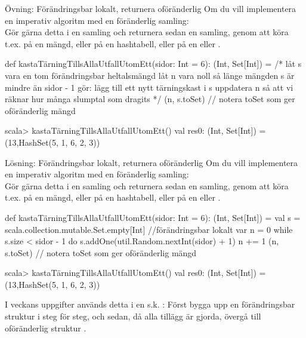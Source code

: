 \begin{Slide}{Övning: Förändringsbar lokalt, returnera oföränderlig}
\SlideFontSmall
Om du vill implementera en imperativ algoritm med en föränderlig samling:\\
Gör gärna detta  i en  samling och returnera sedan en  samling, genom att köra t.ex.  på en mängd, eller  på en hashtabell, eller  på en  eller .
\begin{Code}
def kastaTärningTillsAllaUtfallUtomEtt(sidor: Int = 6): (Int, Set[Int]) = 
  /* 
    låt s vara en tom förändringsbar heltalsmängd
    låt n vara noll
    så länge mängden s är mindre än sidor - 1 gör:
      lägg till ett nytt tärningskast i s
      uppdatera n så att vi räknar hur många slumptal som dragits
  */
  (n, s.toSet)   // notera toSet som ger oföränderlig mängd
\end{Code}
\begin{REPL}
scala> kastaTärningTillsAllaUtfallUtomEtt()
val res0: (Int, Set[Int]) = (13,HashSet(5, 1, 6, 2, 3))
\end{REPL}
\end{Slide}


\begin{Slide}{Lösning: Förändringsbar lokalt, returnera oföränderlig}
\SlideFontSmall
Om du vill implementera en imperativ algoritm med en föränderlig samling:\\
Gör gärna detta  i en  samling och returnera sedan en  samling, genom att köra t.ex.  på en mängd, eller  på en hashtabell, eller  på en  eller .
\begin{Code}
def kastaTärningTillsAllaUtfallUtomEtt(sidor: Int = 6): (Int, Set[Int]) = 
  val s = scala.collection.mutable.Set.empty[Int] //förändringsbar lokalt
  var n = 0
  while s.size < sidor - 1 do
    s.addOne(util.Random.nextInt(sidor) + 1)
    n += 1
  (n, s.toSet)   // notera toSet som ger oföränderlig mängd
\end{Code}
\begin{REPL}
scala> kastaTärningTillsAllaUtfallUtomEtt()
val res0: (Int, Set[Int]) = (13,HashSet(5, 1, 6, 2, 3))
\end{REPL}
I veckans uppgifter används detta i en s.k. : Först bygga upp en förändringsbar struktur i  steg för steg,  
och sedan, då alla tillägg är gjorda, övergå till oföränderlig struktur . 
\end{Slide}


